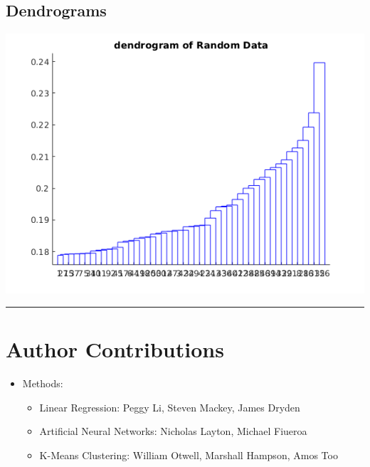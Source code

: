 \documentclass[12pt]{article}
\newcommand{\horizontalLine}{
	\begin{center}
		\hrule width 1.0\textwidth
	\end{center}
}
\begin{document}
\subsection{Dendrograms}
\label{subsec:dendrograms}
\includegraphics[width=\textwidth]{images/clustering/h_random}
\horizontalLine
\section{Author Contributions}
\label{sec:authorContributions}
\begin{itemize}
    \item Methods:
    \begin{itemize}
        \item Linear Regression: Peggy Li, Steven Mackey, James Dryden
        \item Artificial Neural Networks: Nicholas Layton, Michael Fiueroa
        \item K-Means Clustering: William Otwell, Marshall Hampson, Amos Too
    \end{itemize}
\end{itemize}
\end{document}
